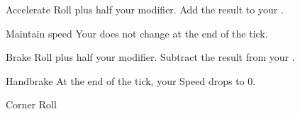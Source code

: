 

\begin{describe}{Accelerate}
  Roll  plus half your  modifier. Add the result to your .
\end{describe}

\begin{describe}{Maintain speed}
  Your  does not change at the end of the tick.
\end{describe}

\begin{describe}{Brake}
  Roll  plus half your  modifier. Subtract the result from your .
\end{describe}

\begin{describe}{Handbrake}
  At the end of the tick, your Speed drops to 0.
\end{describe}

\begin{describe}{Corner}
  Roll 
\end{describe}
